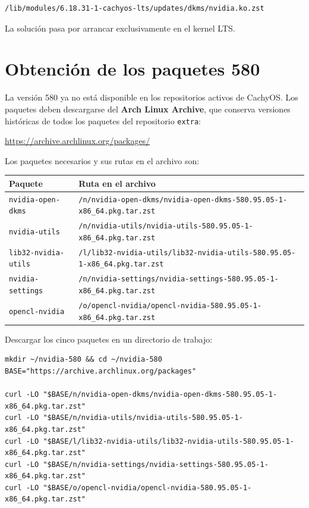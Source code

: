 \documentclass[12pt,a4paper]{article}
\begin{document}
\begin{lstlisting}[style=bash]
/lib/modules/6.18.31-1-cachyos-lts/updates/dkms/nvidia.ko.zst
\end{lstlisting}

La solución pasa por arrancar exclusivamente en el kernel LTS.

\section{Obtención de los paquetes 580}

La versión 580 ya no está disponible en los repositorios activos de CachyOS.
Los paquetes deben descargarse del \textbf{Arch Linux Archive}, que conserva
versiones históricas de todos los paquetes del repositorio \texttt{extra}:

\begin{center}
\url{https://archive.archlinux.org/packages/}
\end{center}

Los paquetes necesarios y sus rutas en el archivo son:

\begin{center}
\begin{tabular}{ll}
  \toprule
  Paquete & Ruta en el archivo \\
  \midrule
  \texttt{nvidia-open-dkms} &
    \texttt{/n/nvidia-open-dkms/nvidia-open-dkms-580.95.05-1-x86\_64.pkg.tar.zst} \\
  \texttt{nvidia-utils} &
    \texttt{/n/nvidia-utils/nvidia-utils-580.95.05-1-x86\_64.pkg.tar.zst} \\
  \texttt{lib32-nvidia-utils} &
    \texttt{/l/lib32-nvidia-utils/lib32-nvidia-utils-580.95.05-1-x86\_64.pkg.tar.zst} \\
  \texttt{nvidia-settings} &
    \texttt{/n/nvidia-settings/nvidia-settings-580.95.05-1-x86\_64.pkg.tar.zst} \\
  \texttt{opencl-nvidia} &
    \texttt{/o/opencl-nvidia/opencl-nvidia-580.95.05-1-x86\_64.pkg.tar.zst} \\
  \bottomrule
\end{tabular}
\end{center}

Descargar los cinco paquetes en un directorio de trabajo:

\begin{lstlisting}[style=bash]
mkdir ~/nvidia-580 && cd ~/nvidia-580
BASE="https://archive.archlinux.org/packages"

curl -LO "$BASE/n/nvidia-open-dkms/nvidia-open-dkms-580.95.05-1-x86_64.pkg.tar.zst"
curl -LO "$BASE/n/nvidia-utils/nvidia-utils-580.95.05-1-x86_64.pkg.tar.zst"
curl -LO "$BASE/l/lib32-nvidia-utils/lib32-nvidia-utils-580.95.05-1-x86_64.pkg.tar.zst"
curl -LO "$BASE/n/nvidia-settings/nvidia-settings-580.95.05-1-x86_64.pkg.tar.zst"
curl -LO "$BASE/o/opencl-nvidia/opencl-nvidia-580.95.05-1-x86_64.pkg.tar.zst"
\end{lstlisting}
\end{document}
